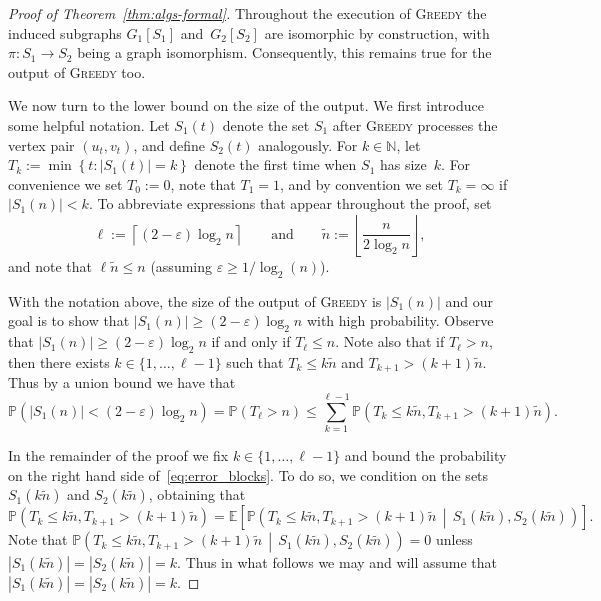 \documentclass[10pt,a4paper]{amsart}
\newcommand{\E}{\mathbb{E}}
\newcommand{\N}{\mathbb{N}}
\renewcommand{\Pr}{\mathbb{P}}
\newcommand{\eps}{\varepsilon}
\newcommand{\greedy}{\textsc{Greedy} }
\begin{document}
\begin{proof}[Proof of Theorem~\ref{thm:algs-formal}]
Throughout the execution of \greedy the induced subgraphs 
$G_{1}[S_{1}]$ and~$G_{2}[S_{2}]$ 
are isomorphic by construction, 
with $\pi : S_{1} \to S_{2}$ being a graph isomorphism. 
Consequently, this remains true for the output of \greedy too. 

We now turn to the lower bound on the size of the output. 
We first introduce some helpful notation. 
Let $S_{1}(t)$ denote the set $S_{1}$ after \greedy processes the vertex pair $(u_{t}, v_{t})$, 
and define $S_{2}(t)$ analogously. 
For $k \in \N$, let $T_{k} := \min \left\{ t : |S_{1}(t)| = k \right\}$ denote the first time when $S_{1}$ has size~$k$. 
For convenience we set $T_{0} := 0$, note that $T_{1} = 1$, and by convention we set $T_{k} = \infty$ if $|S_{1}(n)| < k$. 
To abbreviate expressions that appear throughout the proof, 
set 
\[
\ell := \left\lceil (2-\eps) \log_2 n \right\rceil
\qquad 
\text{and} 
\qquad 
\widetilde{n} := \left\lfloor \frac{n}{2 \log_2 n} \right\rfloor,
\]
and note that $\ell \widetilde{n} \leq n$ (assuming $\eps \geq 1/\log_{2}(n)$).

With the notation above, the size of the output of \greedy is $|S_{1}(n)|$ 
and our goal is to show that $|S_{1}(n)| \geq (2-\eps) \log_2 n$ 
with high probability. 
Observe that $|S_{1}(n)| \geq (2-\eps) \log_2 n$ if and only if $T_{\ell} \leq n$. 
Note also that if $T_{\ell} > n$, 
then there exists $k \in \{1, \ldots, \ell - 1\}$ such that 
$T_{k} \leq k \widetilde{n}$ and $T_{k+1} > (k+1) \widetilde{n}$. Thus by a union bound we have that 
\begin{equation}\label{eq:error_blocks}
\Pr \left( |S_{1}(n)| < (2-\eps) \log_{2}n \right) 
= \Pr( T_{\ell} > n )
\leq \sum_{k=1}^{\ell-1} \Pr \left( T_{k} \leq k \widetilde{n}, T_{k+1} > (k+1) \widetilde{n} \right).
\end{equation}

In the remainder of the proof we fix $k \in \{1, \ldots, \ell - 1\}$
and bound the probability on the right hand side of~\eqref{eq:error_blocks}. 
To do so, we condition on the sets $S_{1}(k \widetilde{n})$ and $S_{2}(k \widetilde{n})$, obtaining that 
\[
\Pr \left( T_{k} \leq k \widetilde{n}, T_{k+1} > (k+1) \widetilde{n} \right) 
= \E \left[ \Pr \left( T_{k} \leq k \widetilde{n}, T_{k+1} > (k+1) \widetilde{n} \, \middle| \, S_{1}(k \widetilde{n}), S_{2}(k \widetilde{n}) \right)  \right].
\]
Note that 
$\Pr \left( T_{k} \leq k \widetilde{n}, T_{k+1} > (k+1) \widetilde{n} \, \middle| \, S_{1}(k \widetilde{n}), S_{2}(k \widetilde{n}) \right) = 0$ 
unless 
$|S_{1}(k \widetilde{n})| = |S_{2}(k \widetilde{n})| = k$. 
Thus in what follows we may and will assume that 
$|S_{1}(k \widetilde{n})| = |S_{2}(k \widetilde{n})| = k$. 


\end{proof}
\end{document}
